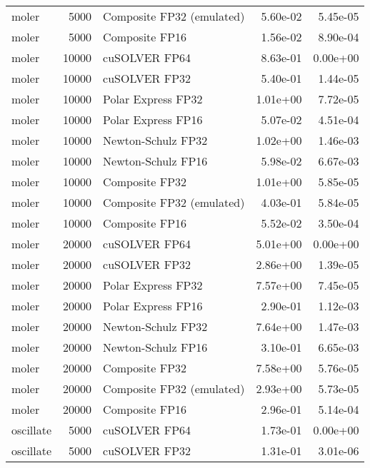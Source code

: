 \begin{table}
\begin{tabular}{lrlrr}
    moler &  5000 & Composite FP32 (emulated) &  5.60e-02 &        5.45e-05 \\
    moler &  5000 &            Composite FP16 &  1.56e-02 &        8.90e-04 \\
    moler & 10000 &             cuSOLVER FP64 &  8.63e-01 &        0.00e+00 \\
    moler & 10000 &             cuSOLVER FP32 &  5.40e-01 &        1.44e-05 \\
    moler & 10000 &        Polar Express FP32 &  1.01e+00 &        7.72e-05 \\
    moler & 10000 &        Polar Express FP16 &  5.07e-02 &        4.51e-04 \\
    moler & 10000 &        Newton-Schulz FP32 &  1.02e+00 &        1.46e-03 \\
    moler & 10000 &        Newton-Schulz FP16 &  5.98e-02 &        6.67e-03 \\
    moler & 10000 &            Composite FP32 &  1.01e+00 &        5.85e-05 \\
    moler & 10000 & Composite FP32 (emulated) &  4.03e-01 &        5.84e-05 \\
    moler & 10000 &            Composite FP16 &  5.52e-02 &        3.50e-04 \\
    moler & 20000 &             cuSOLVER FP64 &  5.01e+00 &        0.00e+00 \\
    moler & 20000 &             cuSOLVER FP32 &  2.86e+00 &        1.39e-05 \\
    moler & 20000 &        Polar Express FP32 &  7.57e+00 &        7.45e-05 \\
    moler & 20000 &        Polar Express FP16 &  2.90e-01 &        1.12e-03 \\
    moler & 20000 &        Newton-Schulz FP32 &  7.64e+00 &        1.47e-03 \\
    moler & 20000 &        Newton-Schulz FP16 &  3.10e-01 &        6.65e-03 \\
    moler & 20000 &            Composite FP32 &  7.58e+00 &        5.76e-05 \\
    moler & 20000 & Composite FP32 (emulated) &  2.93e+00 &        5.73e-05 \\
    moler & 20000 &            Composite FP16 &  2.96e-01 &        5.14e-04 \\
oscillate &  5000 &             cuSOLVER FP64 &  1.73e-01 &        0.00e+00 \\
oscillate &  5000 &             cuSOLVER FP32 &  1.31e-01 &        3.01e-06 \\

\end{tabular}
\end{table}
